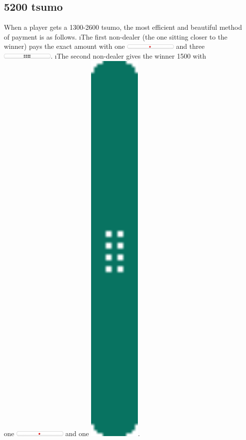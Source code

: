 \subsection*{5200 {\jap tsumo}}
When a player gets a 1300-2600 {\jap tsumo}, the most efficient and beautiful method of payment is as follows.
\be
\i The first non-dealer (the one sitting closer to the winner) pays the exact amount with one \includegraphics[width=1in]{figs/tenbou1000} and three \includegraphics[width=1in]{figs/tenbou100}.
\i The second non-dealer gives the winner 1500 with\\
one \includegraphics[width=1in]{figs/tenbou1000} and one \includegraphics[width=1in]{figs/tenbou500}.

